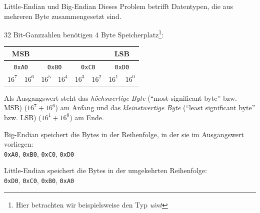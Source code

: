 \begin{example}{Little-Endian und Big-Endian}
    Dieses Problem betrifft Datentypen, die aus mehreren Byte zusammengesetzt sind.

    32 Bit-Ganzzahlen benötigen 4 Byte Speicherplatz\footnote{Hier betrachten wir beispielsweise den Typ \emph{uint}}:

    \begin{center}
        \begin{tabular}{|cc|cc|cc|cc|}
            \multicolumn{2}{c}{\textbf{MSB}}   & \multicolumn{4}{c}{}               & \multicolumn{2}{c}{\textbf{LSB}}                                                                             \\\hline
            \multicolumn{2}{|c}{\texttt{0xA0}} & \multicolumn{2}{|c}{\texttt{0xB0}} & \multicolumn{2}{|c}{\texttt{0xC0}} & \multicolumn{2}{|c|}{\texttt{0xD0}}                                     \\\hline
            $16^7$                             & $16^6$                             & $16^5$                             & $16^4$                              & $16^3$ & $16^2$ & $16^1$ & $16^0$ \\\hline
        \end{tabular}
    \end{center}

    Als Ausgangswert steht das \emph{höchswertige Byte} (\enquote{most significant byte} bzw. MSB) ($16^7 + 16^6$) am Anfang und das \emph{kleinstwertige Byte} (\enquote{least significant byte} bzw. LSB) ($16^1 + 16^0$) am Ende.

    Big-Endian speichert die Bytes in der Reihenfolge, in der sie im Ausgangswert vorliegen:\\
    \texttt{0xA0}, \texttt{0xB0}, \texttt{0xC0}, \texttt{0xD0}

    Little-Endian speichert die Bytes in der umgekehrten Reihenfolge:\\
    \texttt{0xD0}, \texttt{0xC0}, \texttt{0xB0}, \texttt{0xA0}
\end{example}

